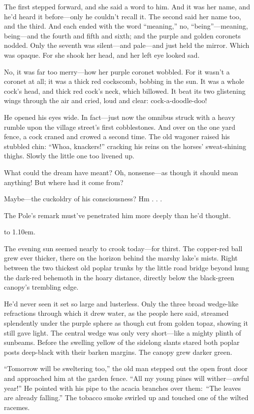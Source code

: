 \documentclass[12pt,a4paper]{article}
\renewcommand{\dotfill}{
  \leavevmode\cleaders\hbox to 1.10em{\hss .\hss }\hfill\kern0pt }
\begin{document}
The first stepped forward, and she said a word to him. And it was her name, and he’d heard it before—only he couldn’t recall it. The second said her name too, and the third. And each ended with the word “meaning,” no, “being”—meaning, being—and the fourth and fifth and sixth; and the purple and golden coronets nodded. Only the seventh was silent—and pale—and just held the mirror. Which was opaque. For she shook her head, and her left eye looked sad.

No, it was far too merry—how her purple coronet wobbled. For it wasn’t a coronet at all; it was a thick red cockscomb, bobbing in the sun. It was a whole cock’s head, and thick red cock’s neck, which billowed. It beat its two glistening wings through the air and cried, loud and clear: cock-a-doodle-doo!

He opened his eyes wide. In fact—just now the omnibus struck with a heavy rumble upon the village street’s first cobblestones. And over on the one yard fence, a cock craned and crowed a second time. The old wagoner raised his stubbled chin: “Whoa, knackers!” cracking his reins on the horses’ sweat-shining thighs. Slowly the little one too livened up.

What could the dream have meant? Oh, nonsense—as though it should mean anything! But where had it come from?

Maybe—the cuckoldry of his consciousness? Hm . . .

The Pole’s remark must’ve penetrated him more deeply than he’d thought.

\null
\noindent\dotfill

\null

The evening sun seemed nearly to crook today—for thirst. The copper-red ball grew ever thicker, there on the horizon behind the marshy lake’s mists. Right between the two thickest old poplar trunks by the little road bridge beyond hung the dark-red behemoth in the hoary distance, directly below the black-green canopy’s trembling edge.

He’d never seen it set so large and lusterless. Only the three broad wedge-like refractions through which it drew water, as the people here said, streamed splendently under the purple sphere as though cut from golden topaz, showing it still gave light. The central wedge was only very short—like a mighty plinth of sunbeams. Before the swelling yellow of the sidelong slants stared both poplar posts deep-black with their barken margins. The canopy grew darker green.

“Tomorrow will be sweltering too,” the old man stepped out the open front door and approached him at the garden fence. “All my young pines will wither—awful year!” He pointed with his pipe to the acacia branches over them: “The leaves are already falling.” The tobacco smoke swirled up and touched one of the wilted racemes.
\end{document}
